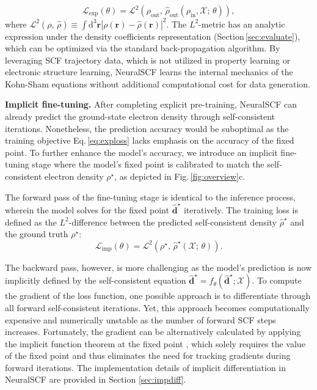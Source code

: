 \documentclass[%
reprint,
superscriptaddress,
bibnotes,
amsmath,amssymb,
aps,
floatfix, %
]{revtex4-2}
\begin{document}
\begin{equation}
  \mathcal{L}_\text{exp}(\theta) = \mathcal{L}^2 (\rho_\text{out}, \,\hat{\rho}_\text{out}(\rho_\text{in}, \mathcal{X}; \,\theta)),
  \label{eq:exploss}
\end{equation}
where $\mathcal{L}^2(\rho,\,\hat{\rho}) \equiv \int \mathrm{d}^3\bm{r} \left|\rho(\bm{r})-\hat{\rho}(\bm{r})\right|^2$. The $L^2$-metric has an analytic expression under the density coefficients representation (Section\,\ref{sec:evaluate}), which can be optimized via the standard back-propagation algorithm. By leveraging SCF trajectory data, which is not utilized in property learning or electronic structure learning, NeuralSCF learns the internal mechanics of the Kohn-Sham equations without additional computational cost for data generation.

\vspace{\baselineskip}

\noindent\textbf{Implicit fine-tuning.} After completing explicit pre-training, NeuralSCF can already predict the ground-state electron density through self-consistent iterations. Nonetheless, the prediction accuracy would be suboptimal as the training objective Eq.\,\eqref{eq:exploss} lacks emphasis on the accuracy of the fixed point. To further enhance the model's accuracy, we introduce an implicit fine-tuning stage where the model's fixed point is calibrated to match the self-consistent electron density $\rho^\star$, as depicted in Fig.\,\ref{fig:overview}c.

The forward pass of the fine-tuning stage is identical to the inference process, wherein the model solves for the fixed point $\hat{\mathbf{d}}^\star$ iteratively. The training loss is defined as the $L^2$-difference between the predicted self-consistent density $\hat{\rho}^\star$ and the ground truth $\rho^\star$:
\begin{equation}
  \mathcal{L}_\text{imp}(\theta) = \mathcal{L}^2 (\rho^\star, \,\hat{\rho}^\star(\mathcal{X}; \,\theta)).
  \label{eq:imploss}
\end{equation}

The backward pass, however, is more challenging as the model's prediction is now implicitly defined by the self-consistent equation $\hat{\mathbf{d}}^\star = f_{\theta}(\hat{\mathbf{d}}^\star; \mathcal{X})$. To compute the gradient of the loss function, one possible approach is to differentiate through all forward self-consistent iterations. Yet, this approach becomes computationally expensive and numerically unstable as the number of forward SCF steps increases. Fortunately, the gradient can be alternatively calculated by applying the implicit function theorem at the fixed point \cite{bai2019deq,kasim2021learning,zhang2022diff}, which solely requires the value of the fixed point and thus eliminates the need for tracking gradients during forward iterations. The implementation details of implicit differentiation in NeuralSCF are provided in Section \ref{sec:impdiff}.
\end{document}
